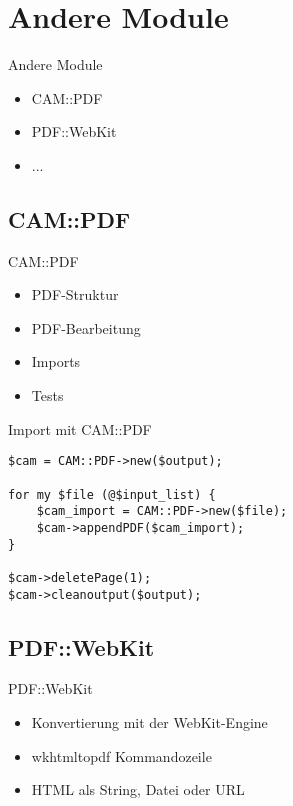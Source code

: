 
\section{Andere Module}

\begin{frame}{Andere Module}
  \begin{itemize}
  \item CAM::PDF
  \item PDF::WebKit
  \item ...
  \end{itemize}
\end{frame}

\subsection{CAM::PDF}
\begin{frame}{CAM::PDF}
  \begin{itemize}
  \item PDF-Struktur
  \item PDF-Bearbeitung
  \item Imports
  \item Tests
  \end{itemize}
\end{frame}

\begin{frame}[fragile]{Import mit CAM::PDF}
\begin{lstlisting}
$cam = CAM::PDF->new($output);
    
for my $file (@$input_list) {
    $cam_import = CAM::PDF->new($file);
    $cam->appendPDF($cam_import);
}

$cam->deletePage(1);
$cam->cleanoutput($output);
\end{lstlisting}
\end{frame}

\subsection{PDF::WebKit}
\begin{frame}{PDF::WebKit}
  \begin{itemize}
  \item Konvertierung mit der WebKit-Engine
  \item wkhtmltopdf Kommandozeile
  \item HTML als String, Datei oder URL
  \end{itemize}
\end{frame}

